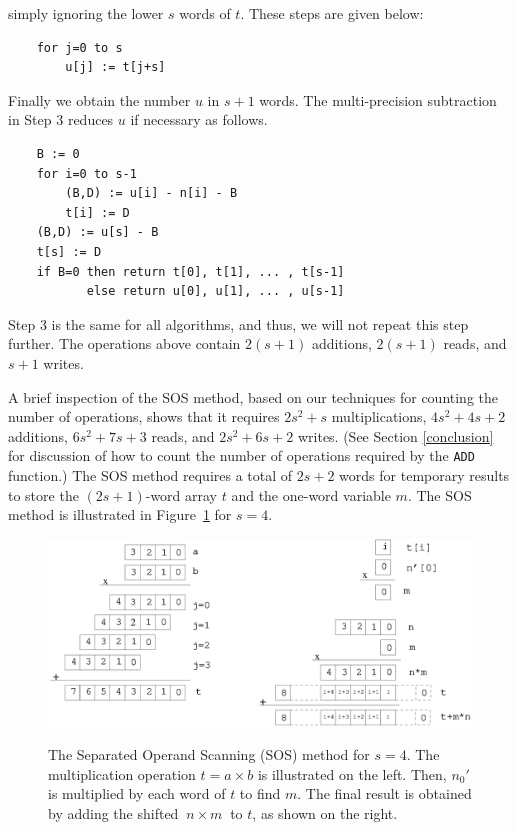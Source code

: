 \documentclass[twocolumn]{svjour3}          %
\begin{document}
simply ignoring the lower $s$ words of $t$. These steps are given below:
%
\begin{verbatim}
    for j=0 to s
        u[j] := t[j+s]
\end{verbatim}
%
Finally we obtain the number $u$ in $s+1$ words. The multi-precision
subtraction in Step 3 reduces $u$ if necessary as follows.
%
\begin{verbatim}
    B := 0
    for i=0 to s-1
        (B,D) := u[i] - n[i] - B
        t[i] := D
    (B,D) := u[s] - B
    t[s] := D
    if B=0 then return t[0], t[1], ... , t[s-1]
           else return u[0], u[1], ... , u[s-1]
\end{verbatim}
%
Step 3 is the same for all algorithms, and thus, we will not repeat
this step further. The operations above contain $2(s+1)$ additions,
$2(s+1)$ reads, and $s+1$ writes.

A brief inspection of the SOS method, based on our techniques for
counting the number of operations, shows that it requires $2s^2+s$
multiplications, $4s^2+4s+2$ additions, $6s^2+7s+3$ reads, and
$2s^2+6s+2$ writes. (See Section \ref{conclusion} for
discussion of how to count the number of operations required by the
{\tt ADD} function.)  The SOS method requires a total of $2s+2$ words
for temporary results to store the $(2s+1)$-word array $t$ and the
one-word variable $m$.  The SOS method is illustrated in
Figure~\ref{sos} for $s=4$.

\begin{figure}[ht]
\caption[The Separated Operand Scanning (SOS) method for $s=4$.]
{The Separated Operand Scanning (SOS) method for $s=4$.
The multiplication operation $t=a\times b$ is illustrated on the left.
Then, $n_0'$ is multiplied by each word of $t$ to find $m$.
The final result is obtained by adding the shifted $~n\times m~$ to
$t$, as shown on the right.}
\includegraphics[width=\columnwidth]{sos.eps}
\label{sos}
\end{figure}
\end{document}
